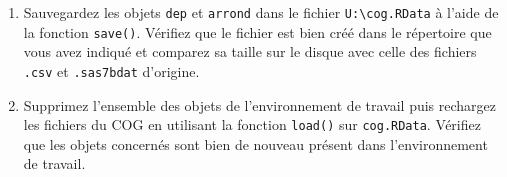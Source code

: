 \documentclass[12pt,twosided, notitlepage]{book}
\newenvironment{Shaded}{}{}
\newcommand{\CommentTok}[1]{\textcolor[rgb]{0.00,0.50,0.00}{#1}}
\newcommand{\DataTypeTok}[1]{#1}
\newcommand{\KeywordTok}[1]{\textcolor[rgb]{0.00,0.00,1.00}{#1}}
\newcommand{\NormalTok}[1]{#1}
\newcommand{\StringTok}[1]{\textcolor[rgb]{0.00,0.50,0.50}{#1}}
\newif \ifsol
\renewenvironment{Shaded}{\begin{snugshade}}{\end{snugshade}}
\begin{document}
\begin{enumerate}
  \begin{center} \rule{0.5\linewidth}{\linethickness}\end{center} 
    \bigskip 
    \fi
\item
  Sauvegardez les objets \texttt{dep} et \texttt{arrond} dans le fichier
  \texttt{U:\textbackslash{}cog.RData} à l'aide de la fonction
  \texttt{save()}. Vérifiez que le fichier est bien
  créé dans le répertoire que vous avez indiqué et comparez sa taille
  sur le disque avec celle des fichiers \texttt{.csv} et
  \texttt{.sas7bdat} d'origine.

  \ifsol 

  \begin{center} \rule{0.5\linewidth}{\linethickness}\end{center}

\begin{Shaded}
\begin{Highlighting}[]
\CommentTok{# Sauvegarde des objets du COG dans cog.RData}
\KeywordTok{save}\NormalTok{(dep, arrond, }\DataTypeTok{file =} \StringTok{"U:/cog.RData"}\NormalTok{)}
\end{Highlighting}
\end{Shaded}

  \begin{center} \rule{0.5\linewidth}{\linethickness}\end{center} 
    \bigskip 
    \fi
\item
  Supprimez l'ensemble des objets de l'environnement de travail puis
  rechargez les fichiers du COG en utilisant la fonction
  \texttt{load()} sur \texttt{cog.RData}. Vérifiez
  que les objets concernés sont bien de nouveau présent dans
  l'environnement de travail.

  \ifsol 

  \begin{center} \rule{0.5\linewidth}{\linethickness}\end{center}

\begin{Shaded}
\begin{Highlighting}[]
\CommentTok{# Suppression de tous les fichiers de l'environnement de travail}
\KeywordTok{rm}\NormalTok{(}\DataTypeTok{list =} \KeywordTok{ls}\NormalTok{())}
\KeywordTok{ls}\NormalTok{()}

\CommentTok{# Chargement des fichiers du COG}
\KeywordTok{load}\NormalTok{(}\StringTok{"U:/cog.RData"}\NormalTok{)}
\KeywordTok{ls}\NormalTok{()}
\end{Highlighting}
\end{Shaded}

\begin{verbatim}
  ## [1] "arrond" "dep"
\end{verbatim}

  \begin{center} \rule{0.5\linewidth}{\linethickness}\end{center} 
    \bigskip 
    \fi
\end{enumerate}
\end{document}

